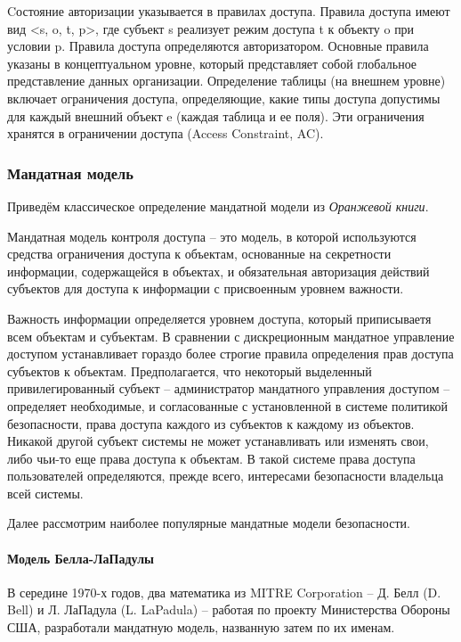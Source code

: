 Cостояние авторизации указывается в правилах доступа. Правила доступа имеют вид <s, o, t, p>, где субъект s 
реализует режим доступа t к объекту o при условии p. Правила доступа определяются авторизатором. Основные правила 
указаны в концептуальном уровне, который представляет собой глобальное представление данных организации. Определение 
таблицы (на внешнем уровне) включает ограничения доступа, определяющие, какие типы доступа допустимы для
каждый внешний объект e (каждая таблица и ее поля). Эти ограничения хранятся в ограничении доступа (Access Constraint, AC).

\subsubsection{Мандатная модель}

Приведём классическое определение мандатной модели из \textit{Оранжевой книги}.  

\begin{grayquote}
Мандатная модель контроля доступа – это модель, в которой используются средства ограничения доступа к объектам,  основанные на секретности информации,  содержащейся в объектах, и обязательная авторизация действий субъектов для доступа к информации с присвоенным уровнем важности.  
\end{grayquote}

Важность информации определяется уровнем доступа,  который приписываетя всем объектам и субъектам.  В сравнении с дискреционным мандатное управление доступом устанавливает гораздо более строгие правила определения прав доступа субъектов к объектам. Предполагается, что некоторый выделенный привилегированный субъект – администратор мандатного управления доступом – определяет необходимые, и согласованные с установленной в системе политикой безопасности, права доступа каждого из субъектов к каждому из объектов. Никакой другой субъект системы не может устанавливать или изменять свои, либо чьи-то еще права доступа к объектам. В такой системе права доступа пользователей определяются, прежде всего, интересами безопасности владельца всей системы.

Далее рассмотрим наиболее популярные мандатные модели безопасности. 

\paragraph{Модель Белла-ЛаПадулы}

В середине 1970-х годов, два математика из MITRE Corporation -- Д. Белл (D. Bell) и Л. ЛаПадула (L. LaPadula) -- работая по проекту Министерства Обороны США, разработали мандатную модель, названную затем по их именам.

